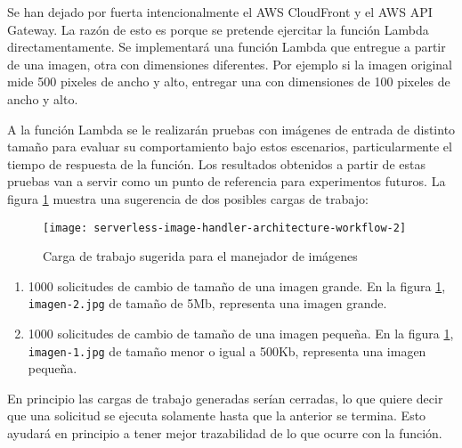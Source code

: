 Se han dejado por fuerta intencionalmente el AWS CloudFront y el AWS API Gateway. La razón de esto es porque se pretende ejercitar la función Lambda directamentamente. Se implementará una función Lambda que entregue a partir de una imagen, otra con dimensiones diferentes. Por ejemplo si la imagen original mide 500 pixeles de ancho y alto, entregar una con dimensiones de 100 pixeles de ancho y alto. 

A la función Lambda se le realizarán pruebas con imágenes de entrada de distinto tamaño para evaluar su comportamiento bajo estos escenarios, particularmente el tiempo de respuesta de la función. Los resultados obtenidos a partir de estas pruebas van a servir como un punto de referencia para experimentos futuros. La figura \ref{fig:serverless-image-handler-architecture-workflow} muestra una sugerencia de dos posibles cargas de trabajo: 

\begin{figure}[h]
  \centering
  \texttt{[image: serverless-image-handler-architecture-workflow-2]}
  \caption[Carga de trabajo sugerida para el manejador de imágenes]{Carga de trabajo sugerida para el manejador de imágenes}
  \label{fig:serverless-image-handler-architecture-workflow}
\end{figure}

\begin{enumerate}
    \item 1000 solicitudes de cambio de tamaño de una imagen grande. En la figura \ref{fig:serverless-image-handler-architecture-workflow}, \texttt{imagen-2.jpg} de tamaño de 5Mb, representa una imagen grande.
    \item 1000 solicitudes de cambio de tamaño de una imagen pequeña. En la figura \ref{fig:serverless-image-handler-architecture-workflow}, \texttt{imagen-1.jpg} de tamaño menor o igual a 500Kb, representa una imagen pequeña.
\end{enumerate}

En principio las cargas de trabajo generadas serían cerradas, lo que quiere decir que una solicitud se ejecuta solamente hasta que la anterior se termina. Esto ayudará en principio a tener mejor trazabilidad de lo que ocurre con la función.

